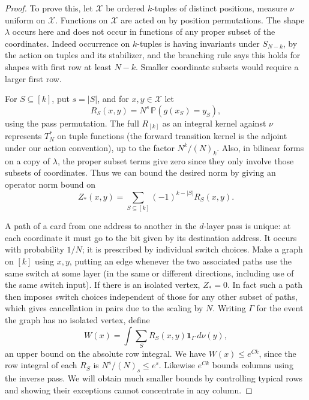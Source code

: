 \begin{proof}\label{tra:tilted-arrays:sparse-proof}
\label{tra:tilted-arrays:forest-and-unordered-set-proof}
To prove this, let \(\mathcal X\) be ordered \(k\)-tuples of distinct positions, measure \(\nu\) uniform on \(\mathcal X\). Functions on \(\mathcal X\) are acted on by position permutations. The shape \(\lambda\) occurs here and does not occur in functions of any proper subset of the coordinates. Indeed occurrence on \(k\)-tuples is having invariants under \(S_{N-k}\), by the action on tuples and its stabilizer, and the branching rule says this holds for shapes with first row at least \(N-k\). Smaller coordinate subsets would require a larger first row.

For \(S\subseteq [k]\), put \(s=|S|\), and for \(x,y\in\mathcal X\) let
\[
 R_S(x,y)=N^s\,\mathbb P(g(x_S)=y_S),
\]
using the pass permutation. The full \(R_{[k]}\) as an integral kernel against \(\nu\) represents \(T_N^*\) on tuple functions (the forward transition kernel is the adjoint under our action convention), up to the factor \(N^k/(N)_k\). Also, in bilinear forms on a copy of \(\lambda\), the proper subset terms give zero since they only involve those subsets of coordinates. Thus we can bound the desired norm by giving an operator norm bound on
\[
 Z_*(x,y)=\sum_{S\subseteq [k]}(-1)^{k-|S|}R_S(x,y) .
\]

A path of a card from one address to another in the \(d\)-layer pass is unique: at each coordinate it must go to the bit given by its destination address. It occurs with probability \(1/N\); it is prescribed by individual switch choices. Make a graph on \([k]\) using \(x,y\), putting an edge whenever the two associated paths use the same switch at some layer (in the same or different directions, including use of the same switch input). If there is an isolated vertex, \(Z_*=0\). In fact such a path then imposes switch choices independent of those for any other subset of paths, which gives cancellation in pairs due to the scaling by \(N\). Writing \(\Gamma\) for the event the graph has no isolated vertex, define
\[
 W(x)=\int\sum_S R_S(x,y)\mathbf 1_\Gamma\,d\nu(y),
\]
an upper bound on the absolute row integral. We have \(W(x)\le e^{Ck}\), since the row integral of each \(R_S\) is \(N^s/(N)_s\le e^s\). Likewise \(e^{Ck}\) bounds columns using the inverse pass. We will obtain much smaller bounds by controlling typical rows and showing their exceptions cannot concentrate in any column.


\end{proof}
